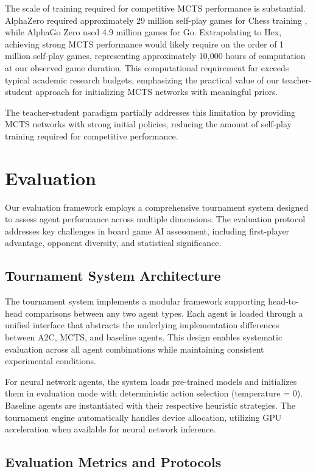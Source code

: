 \documentclass[conference]{IEEEtran}
\begin{document}
The scale of training required for competitive MCTS performance is substantial. AlphaZero required approximately 29 million self-play games for Chess training \cite{alphago_zero}, while AlphaGo Zero used 4.9 million games for Go. Extrapolating to Hex, achieving strong MCTS performance would likely require on the order of 1 million self-play games, representing approximately 10,000 hours of computation at our observed game duration. This computational requirement far exceeds typical academic research budgets, emphasizing the practical value of our teacher-student approach for initializing MCTS networks with meaningful priors.

The teacher-student paradigm partially addresses this limitation by providing MCTS networks with strong initial policies, reducing the amount of self-play training required for competitive performance.

\section{Evaluation}

Our evaluation framework employs a comprehensive tournament system designed to assess agent performance across multiple dimensions. The evaluation protocol addresses key challenges in board game AI assessment, including first-player advantage, opponent diversity, and statistical significance.

\subsection{Tournament System Architecture}

The tournament system implements a modular framework supporting head-to-head comparisons between any two agent types. Each agent is loaded through a unified interface that abstracts the underlying implementation differences between A2C, MCTS, and baseline agents. This design enables systematic evaluation across all agent combinations while maintaining consistent experimental conditions.

For neural network agents, the system loads pre-trained models and initializes them in evaluation mode with deterministic action selection (temperature = 0). Baseline agents are instantiated with their respective heuristic strategies. The tournament engine automatically handles device allocation, utilizing GPU acceleration when available for neural network inference.

\subsection{Evaluation Metrics and Protocols}
\end{document}
